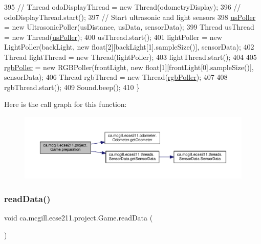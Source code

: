 \begin{DoxyCode}
395     \textcolor{comment}{// Thread odoDisplayThread = new Thread(odometryDisplay);}
396     \textcolor{comment}{// odoDisplayThread.start();}
397     \textcolor{comment}{// Start ultrasonic and light sensors}
398     \hyperlink{enumca_1_1mcgill_1_1ecse211_1_1project_1_1_game_af6fee74efff891793b32352caa110465}{usPoller} = new UltrasonicPoller(usDistance, usData, sensorData);
399     Thread usThread = new Thread(\hyperlink{enumca_1_1mcgill_1_1ecse211_1_1project_1_1_game_af6fee74efff891793b32352caa110465}{usPoller});
400     usThread.start();
401     lightPoller = new LightPoller(backLight, new \textcolor{keywordtype}{float}[2][backLight[1].sampleSize()], sensorData);
402     Thread lightThread = new Thread(lightPoller);
403     lightThread.start();
404 
405     \hyperlink{enumca_1_1mcgill_1_1ecse211_1_1project_1_1_game_af24a953a0c3438670220dde36c532b5d}{rgbPoller} = new RGBPoller(frontLight, new \textcolor{keywordtype}{float}[1][frontLight[0].sampleSize()], sensorData);
406     Thread rgbThread = new Thread(\hyperlink{enumca_1_1mcgill_1_1ecse211_1_1project_1_1_game_af24a953a0c3438670220dde36c532b5d}{rgbPoller});
407 
408     rgbThread.start();
409     Sound.beep();
410   \}
\end{DoxyCode}
Here is the call graph for this function\+:\nopagebreak
\begin{figure}[H]
\begin{center}
\leavevmode
\includegraphics[width=350pt]{enumca_1_1mcgill_1_1ecse211_1_1project_1_1_game_a8f3c5b18f98ee56f5f03afd72fa40bcb_cgraph}
\end{center}
\end{figure}
\mbox{\label{enumca_1_1mcgill_1_1ecse211_1_1project_1_1_game_a032b53e9b16b9d470b461de4a311a698}} 
\subsubsection{\texorpdfstring{read\+Data()}{readData()}}
{\footnotesize\ttfamily void ca.\+mcgill.\+ecse211.\+project.\+Game.\+read\+Data (\begin{DoxyParamCaption}{ }\end{DoxyParamCaption})}

